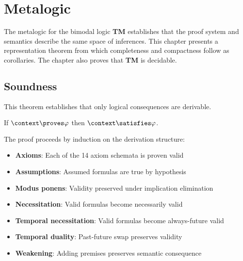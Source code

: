 \documentclass[../BimodalReference.tex]{subfiles}
\begin{document}
\section{Metalogic}

The metalogic for the bimodal logic \textbf{TM} establishes that the proof system and semantics describe the same space of inferences.
This chapter presents a representation theorem from which completeness and compactness follow as corollaries.
The chapter also proves that \textbf{TM} is decidable.

\subsection{Soundness}

This theorem establishes that only logical consequences are derivable.

\begin{theorem}[Soundness]
If $\context \proves \varphi$ then $\context \satisfies \varphi$.
\end{theorem}

The proof proceeds by induction on the derivation structure:
\begin{itemize}
  \item \textbf{Axioms}: Each of the 14 axiom schemata is proven valid
  \item \textbf{Assumptions}: Assumed formulas are true by hypothesis
  \item \textbf{Modus ponens}: Validity preserved under implication elimination
  \item \textbf{Necessitation}: Valid formulas become necessarily valid
  \item \textbf{Temporal necessitation}: Valid formulas become always-future valid
  \item \textbf{Temporal duality}: Past-future swap preserves validity
  \item \textbf{Weakening}: Adding premises preserves semantic consequence
\end{itemize}
\end{document}
